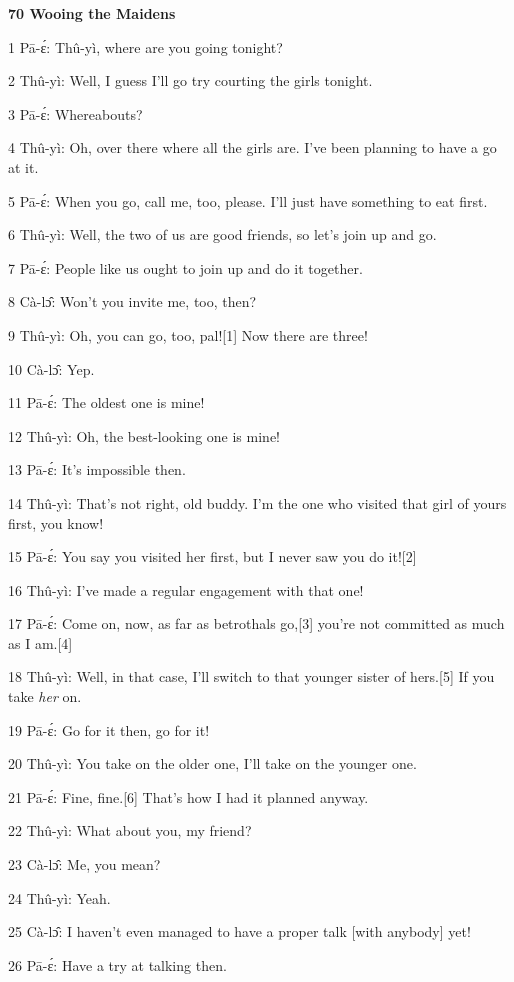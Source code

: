 
{\textbf{70 Wooing the Maidens}}

{1 Pā-ɛ́: Thû-yì, where are you going tonight?}

{2 Thû-yì: Well, I guess I'll go try courting the girls tonight.}

{3 Pā-ɛ́: Whereabouts?}

{4 Thû-yì: Oh, over there where all the girls are. I've been planning
to have a go at it.}

{5 Pā-ɛ́: When you go, call me, too, please. I'll just have something
to eat first.}

{6 Thû-yì: Well, the two of us are good friends, so let's join up and
go. }

{7 Pā-ɛ́: People like us ought to join up and do it together.}

{8 Cà-lɔ̂: Won't you invite me, too, then?}

{9 Thû-yì: Oh, you can go, too, pal![1] Now there are three!}

{10 Cà-lɔ̂: Yep.}

{11 Pā-ɛ́: The oldest one is mine!}

{12 Thû-yì: Oh, the best-looking one is mine!}

{13 Pā-ɛ́: It's impossible then.}

{14 Thû-yì: That's not right, old buddy. I'm the one who visited that
girl of yours first, you know!}

{15 Pā-ɛ́: You say you visited her first, but I never saw you do it![2]}

{16 Thû-yì: I've made a regular engagement with that one!}

{17 Pā-ɛ́: Come on, now, as far as betrothals go,[3] you're not committed
as much as I am.[4]}

{18 Thû-yì: Well, in that case, I'll switch to that younger sister of
hers.[5] If you take }{\textit{her}}{ on.}

{19 Pā-ɛ́: Go for it then, go for it!}

{20 Thû-yì: You take on the older one, I'll take on the younger one.}

{21 Pā-ɛ́: Fine, fine.[6] That's how I had it planned anyway.}

{22 Thû-yì: What about you, my friend?}

{23 Cà-lɔ̂: Me, you mean?}

{24 Thû-yì: Yeah.}

{25 Cà-lɔ̂: I haven't even managed to have a proper talk [with anybody]
yet!}

{26 Pā-ɛ́: Have a try at talking then. }

